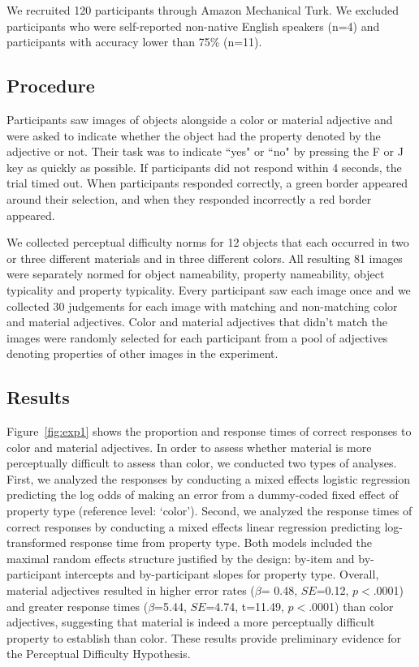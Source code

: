 \documentclass[12pt,letterpaper]{article}
\begin{document}
We recruited 120 participants through Amazon Mechanical Turk. We excluded participants who were self-reported non-native English speakers (n=4) and participants with accuracy lower than 75\% (n=11).

\subsection{Procedure} 

Participants saw images of objects alongside a color or material adjective and were asked to indicate whether the object had the property denoted by the adjective or not. Their task was to indicate ``yes" or ``no" by pressing the F or J key as quickly as possible. If participants did not respond within 4 seconds, the trial timed out. When participants responded correctly, a green border appeared around their selection, and when they responded incorrectly a red border appeared.

We collected perceptual difficulty norms for 12 objects that each occurred in two or three different materials and in three different colors. All resulting 81 images were separately normed for object nameability, property nameability, object typicality and property typicality. Every participant saw each image once and we collected 30 judgements for each image with matching and non-matching color and material adjectives. Color and material adjectives that didn't match the images were randomly selected for each participant from a pool of adjectives denoting properties of other images in the experiment.

\subsection{Results} 

Figure~\ref{fig:exp1} shows the proportion and response times of correct responses to color and material adjectives.  In order to assess whether material is more perceptually difficult to assess than color, we conducted two types of analyses. First, we analyzed the responses by conducting a mixed effects logistic regression predicting the log odds of making an error from a dummy-coded fixed effect of property type (reference level: `color'). Second, we analyzed the response times of correct responses by conducting a mixed effects linear regression predicting log-transformed response time from property type. Both models included the maximal random effects structure justified by the design: by-item and by-participant intercepts and by-participant slopes for property type. Overall, material adjectives resulted in higher error rates ($\beta$= 0.48, $SE$=0.12, $p$$<$.0001) and greater response times ($\beta$=5.44, $SE$=4.74, t=11.49, $p$$<$.0001) than color adjectives, suggesting that material is indeed a more perceptually difficult property to establish than color.  These results provide preliminary evidence for the Perceptual Difficulty Hypothesis. 
\end{document}
